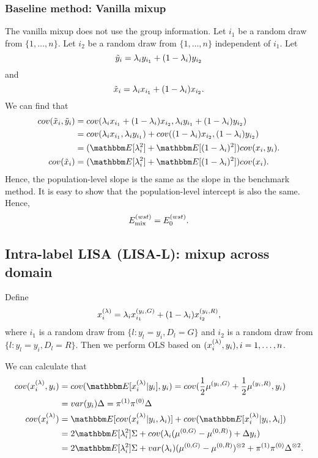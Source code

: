 \subsubsection{Baseline method: Vanilla mixup}
The vanilla mixup does not use the group information. Let $i_1$ be a random draw from $\{1,\dots, n\}$. Let $i_2$ be a random draw from $\{1,\dots, n\}$ independent of $i_1$.
Let
\[
   \tilde{y}_i=\lambda_i y_{i_1}+(1-\lambda_i)y_{i_2}
\]
and
\[
  \tilde{x}_i=\lambda_i x_{i_1}+(1-\lambda_i)x_{i_2}.
\]
We can find that
\begin{align*}
    cov(\tx_i,\ty_i)&=cov(\lam_i x_{i_1}+(1-\lam_i)x_{i_2},\lam_i y_{i_1}+(1-\lam_i)y_{i_2})\\
    &=cov(\lam_i x_{i_1},\lam_i y_{i_1})+cov((1-\lam_i)x_{i_2},(1-\lam_i)y_{i_2})\\
    &=(\E[\lam_i^2]+\E[(1-\lam_i)^2])cov(x_i,y_i).\\
    cov(\tx_i)&=(\E[\lam_i^2]+\E[(1-\lam_i)^2])cov(x_i).
\end{align*}
Hence, the population-level slope is the same as the slope in the benchmark method. It is easy to show that the population-level intercept is also the same. Hence,
\begin{align*}
E_{\textup{mix}}^{(wst)}=E_0^{(wst)}.
\end{align*}


\subsection{Intra-label LISA (LISA-L): mixup across domain}

Define
\[
  x_i^{(\lambda)}=\lambda_i x_{i_1}^{(y_i,G)}+(1-\lambda_i)x_{i_2}^{(y_i,R)},
\]
where $i_1$ is a random draw from $\{l: y_l=y_i,D_l=G\}$ and $i_2$ is a random draw from $\{l: y_l=y_i,D_l=R\}$. Then we perform OLS based on $(x_i^{(\lambda)},y_i),i=1,\dots,n$.

We can calculate that
\begin{align*}
cov(x_i^{(\lam)},y_i)&=cov(\E[x_i^{(\lam)}|y_i],y_i)=cov(\frac{1}{2}\mu^{(y_i,G)}+\frac{1}{2}\mu^{(y_i,R)},y_i)\\
& =var(y_i)\Delta=\pi^{(1)}\pi^{(0)}\Delta\\
cov(x_i^{(\lam)})&=\E[cov(x_i^{(\lam)}|y_i,\lam_i)]+cov(\E[x_i^{(\lam)}|y_i,\lam_i])\\
&=2\E[\lam_i^2]\Sig+cov(\lam_i(\mu^{(0,G)}-\mu^{(0,R)})+\Delta y_i)\\
&=2\E[\lam_i^2]\Sig+var(\lam_i)(\mu^{(0,G)}-\mu^{(0,R)})^{\otimes 2}+\pi^{(1)}\pi^{(0)}\Delta^{\otimes 2}.
\end{align*}


